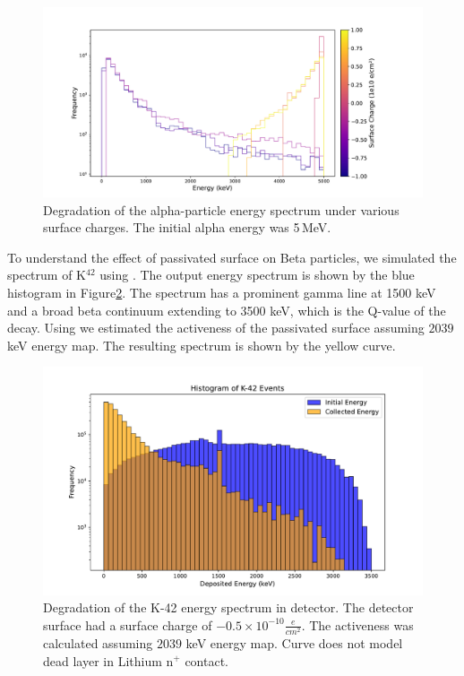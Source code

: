 \begin{figure}%
  \centering
  \includegraphics[trim={2cm 0.5cm 4.5cm 1.7cm},clip,width=0.99\linewidth]{ch5/figs/eng_deg_hist.pdf}
  \caption{Degradation of the alpha-particle energy spectrum under various surface charges. The initial alpha energy was 5\,MeV.}
  \label{fig:eng_spec_degradation}
\end{figure}

To understand the effect of passivated surface on Beta particles, we simulated the spectrum of K$^{42}$ using {\geant}. The output energy spectrum is shown by the blue histogram in Figure\ref{ch5_figs_k_42_degrad}. The spectrum has a prominent gamma line at 1500 keV and a broad beta continuum extending to 3500 keV, which is the Q-value of the decay. Using {\ehd} we estimated the activeness of the passivated surface assuming $2039$ keV energy map. The resulting spectrum is shown by the yellow curve.

\begin{figure}%
  \centering
  \includegraphics[trim={1.5cm 0.0cm 2cm 1.76cm},clip,width=0.99\linewidth]{ch5/figs/k_42_beta_spectrum.pdf}
  \caption{Degradation of the K-42 energy spectrum in {\ponama} detector. The detector surface had a surface charge of $- 0.5 \times 10^{-10} \frac{e}{cm^2}$. The activeness was calculated assuming $2039$ keV energy map. Curve does not model dead layer in Lithium n$^+$ contact.}
  \label{ch5_figs_k_42_degrad}
\end{figure}

